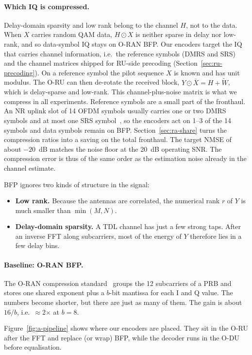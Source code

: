 \paragraph{Which IQ is compressed.} Delay-domain sparsity and low rank belong to the channel $H$, not to the data. When $X$ carries random QAM data, $H \odot X$ is neither sparse in delay nor low-rank, and so data-symbol IQ stays on O-RAN BFP. Our encoders target the IQ that carries channel information, i.e.\ the reference symbols (DMRS and SRS) and the channel matrices shipped for RU-side precoding (Section~\ref{sec:ru-precoding}). On a reference symbol the pilot sequence $X$ is known and has unit modulus. The O-RU can then de-rotate the received block, $Y \odot \bar X = H + \tilde W$, which is delay-sparse and low-rank. This channel-plus-noise matrix is what we compress in all experiments. Reference symbols are a small part of the fronthaul. An NR uplink slot of 14 OFDM symbols usually carries one or two DMRS symbols and at most one SRS symbol~\cite{ts38211}, so the encoders act on 1--3 of the 14 symbols and data symbols remain on BFP. Section~\ref{sec:ra-share} turns the compression ratios into a saving on the total fronthaul. The target NMSE of about $-20$~dB matches the noise floor at the 20~dB operating SNR. The compression error is thus of the same order as the estimation noise already in the channel estimate.

BFP ignores two kinds of structure in the signal:
\begin{itemize}
  \item \textbf{Low rank.} Because the antennas are correlated, the numerical rank $r$ of $Y$ is much smaller than $\min(M,N)$.
  \item \textbf{Delay-domain sparsity.} A TDL channel has just a few strong taps. After an inverse FFT along subcarriers, most of the energy of $Y$ therefore lies in a few delay bins.
\end{itemize}

\paragraph{Baseline: O-RAN BFP.} The O-RAN compression standard~\cite{oran_cus} groups the 12 subcarriers of a PRB and stores one shared exponent plus a $b$-bit mantissa for each I and Q value. The numbers become shorter, but there are just as many of them. The gain is about $16/b$, i.e.\ $\approx$2$\times$ at $b=8$.

Figure~\ref{fig:a-pipeline} shows where our encoders are placed. They sit in the O-RU after the FFT and replace (or wrap) BFP, while the decoder runs in the O-DU before equalisation.

